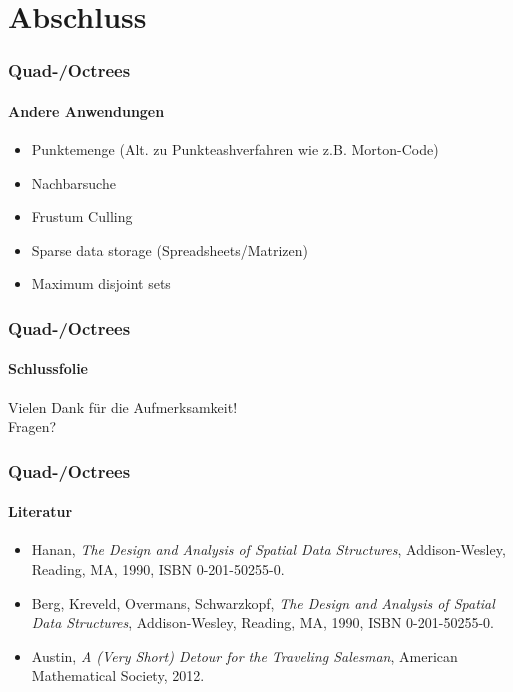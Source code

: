 \documentclass{beamer}
\begin{document}
\section{Abschluss}

\begin{frame}
  \frametitle{Quad-/Octrees}
  \framesubtitle{Andere Anwendungen}
  \begin{itemize}
    \item Punktemenge (Alt. zu Punkteashverfahren wie z.B. Morton-Code)
    \item Nachbarsuche
    \item Frustum Culling
    \item Sparse data storage (Spreadsheets/Matrizen)
    \item Maximum disjoint sets
  \end{itemize}
\end{frame}

\begin{frame}
  \frametitle{Quad-/Octrees}
  \framesubtitle{Schlussfolie}
  \begin{center}
    Vielen Dank für die Aufmerksamkeit! \\
    \hfill\break
    Fragen?
  \end{center}
\end{frame}

\begin{frame}
  \frametitle{Quad-/Octrees}
  \framesubtitle{Literatur}
  \begin{itemize}
    \item Hanan, \emph{The Design and Analysis of Spatial Data Structures}, Addison-Wesley, Reading, MA, 1990, ISBN 0-201-50255-0.
    \item Berg, Kreveld, Overmans, Schwarzkopf, \emph{The Design and Analysis of Spatial Data Structures}, Addison-Wesley, Reading, MA, 1990, ISBN 0-201-50255-0.
    \item Austin, \emph{A (Very Short) Detour for the Traveling Salesman}, American Mathematical Society, 2012.
  \end{itemize}
\end{frame}
\end{document}
